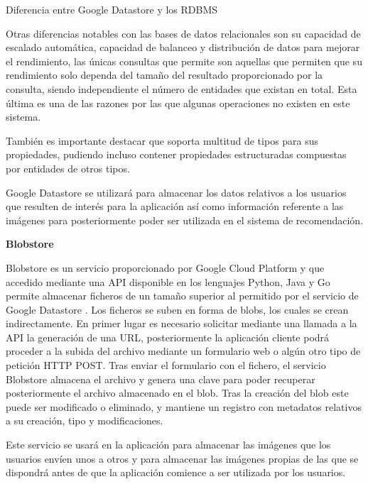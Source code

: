 \begin{table}[hp]
  \centering
  {\small
  
  }
  \caption[Diferencia entre Google Datastore y los \acs{RDBMS}]
  {Diferencia entre Google Datastore y los \acs{RDBMS}}
  \label{tab:datastore-rdbms}
\end{table}

Otras diferencias notables con las bases de datos relacionales son su capacidad de escalado automática, capacidad de balanceo y distribución de datos para mejorar el rendimiento, las únicas consultas que permite son aquellas que permiten que su rendimiento solo dependa del tamaño del resultado proporcionado por la consulta, siendo independiente el número de entidades que existan en total. Esta última es una de las razones por las que algunas operaciones no existen en este sistema.

También es importante destacar que soporta multitud de tipos para sus propiedades, pudiendo incluso contener propiedades estructuradas compuestas por entidades de otros tipos.

Google Datastore se utilizará para almacenar los datos relativos a los usuarios que resulten de interés para la aplicación así como información referente a las imágenes para posteriormente poder ser utilizada en el sistema de recomendación.


\textbf{Blobstore}

Blobstore es un servicio proporcionado por Google Cloud Platform y que accedido mediante una \acs{API} disponible en los lenguajes Python, Java y Go permite almacenar ficheros de un tamaño superior al permitido por el servicio de Google Datastore \cite{Blobstore}. Los ficheros se suben en forma de blobs, los cuales se crean indirectamente. En primer lugar  es necesario solicitar mediante una llamada a la \acs{API} la generación de una \acs{URL}, posteriormente la aplicación cliente podrá proceder a la subida del archivo mediante un formulario web o algún otro tipo de petición \acs{HTTP} POST. Tras enviar el formulario con el fichero, el servicio Blobstore almacena el archivo y genera una clave para poder recuperar posteriormente el archivo almacenado en el blob. Tras la creación del blob este puede ser modificado o eliminado, y mantiene un registro con metadatos relativos a su creación, tipo y modificaciones.

Este servicio se usará en la aplicación para almacenar las imágenes que los usuarios envíen unos a otros y para almacenar las imágenes propias de las que se dispondrá antes de que la aplicación comience a ser utilizada por los usuarios.

